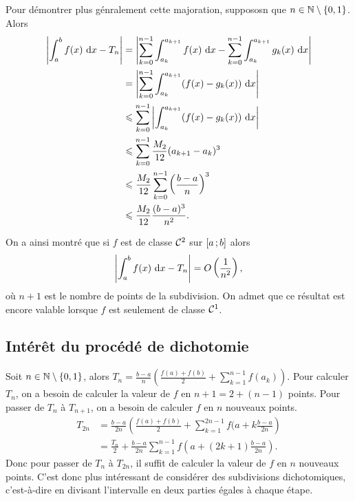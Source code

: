 Pour démontrer plus génralement cette majoration, suppososn que \(n \in
\mathbb{N}\setminus\{0,1\}\). Alors
\begin{align*}
  \left|\int_a^b f(x)\,\mathop{}\mathopen{}\mathrm{d} x-T_{n}\right| &= \left| \sum_{k = 0}^{n-1}
  \int_{a_k}^{a_{k+1}} f(x)\,\mathop{}\mathopen{}\mathrm{d} x -  \sum_{k = 0}^{n-1} \int_{a_k}^{a_{k+1}}
  g_k(x)\,\mathop{}\mathopen{}\mathrm{d} x \right| \\
  &= \left| \sum_{k = 0}^{n-1} \int_{a_k}^{a_{k+1}} (f(x) -g_k(x))\,\mathop{}\mathopen{}\mathrm{d} x
  \right| \\
  &\leqslant \sum_{k = 0}^{n-1} \left|\int_{a_k}^{a_{k+1}} (f(x) -g_k(x))\,\mathop{}\mathopen{}\mathrm{d} x
  \right| \\
  &\leqslant \sum_{k = 0}^{n-1} \frac{M_2}{12} (a_{k+1}-a_k)^3 \\
  &\leqslant \frac{M_2}{12} \sum_{k = 0}^{n-1} \left(\frac{b-a}{n}\right)^3 \\
  &\leqslant \frac{M_2}{12} \frac{(b-a)^3}{n^2}.
\end{align*}

On a ainsi montré que si \(f\) est de classe \(\mathcal{C}^{2}\) sur
\(\left[ a \, ; {} b \right]\) alors
\begin{equation}
  \left|\int_a^b f(x)\,\mathop{}\mathopen{}\mathrm{d} x-T_n \right| = O\left(\frac{1}{n^2}\right),
\end{equation}
où \(n+1\) est le nombre de points de la subdivision. On admet que ce résultat
est encore valable lorsque \(f\) est seulement de classe \(\mathcal{C}^{1}\).

\subsection{Intérêt du procédé de dichotomie}

Soit \(n \in \mathbb{N}\setminus\{0,1\}\), alors \(T_n =
\frac{b-a}{n}\left(\frac{f(a)+f(b)}{2} + \sum_{k = 1}^{n-1}f(a_k)\right)\). Pour
calculer \(T_n\), on a besoin de calculer la valeur de \(f\) en \(n+1 = 2+(n-1)\)
points. Pour passer de \(T_n\) à \(T_{n+1}\), on a besoin de calculer \(f\) en
\(n\) nouveaux points.
\begin{align*}
  T_{2n} &= \frac{b-a}{2n}\left(\frac{f(a)+f(b)}{2} + \sum_{k = 1}^{2n-1}f(a+k
  \frac{b-a}{2n}\right)\\
  & = \frac{T_n}{2} + \frac{b-a}{2n}
  \sum_{k = 1}^{n-1}f\left(a+(2k+1)\frac{b-a}{2n}\right).
\end{align*}
Donc pour passer de \(T_n\) à \(T_{2n}\), il suffit de calculer la valeur de
\(f\) en \(n\) nouveaux points. C'est donc plus intéressant de considérer des
subdivisions dichotomiques, c'est-à-dire en divisant l'intervalle en deux
parties égales à chaque étape.

